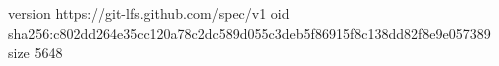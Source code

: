 version https://git-lfs.github.com/spec/v1
oid sha256:c802dd264e35cc120a78c2dc589d055c3deb5f86915f8c138dd82f8e9e057389
size 5648
